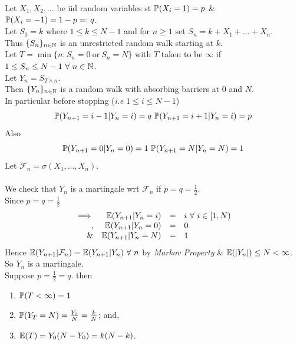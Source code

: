 \documentclass[11pt,a4paper]{article}
\begin{document}
\proposition{}
Let $X_1,X_2,\dots$ be iid random variables st $\mathbb{P}(X_i=1)=p$ \& $\mathbb{P}(X_i=-1)=1-p=:q$.\\
Let $S_0=k$ where $1\leq k\leq N-1$ and for $n\geq 1$ set $S_n=k+X_1+\dots+X_n$.\\
Thus $\{S_n\}_{n\in\mathbb{N}}$ is an unrestricted random walk starting at $k$.\\
Let $T=\min\{n:S_n=0\ \mathrm{or}\ S_n=N\}$ with $T$ taken to be $\infty$ if $1\leq S_n\leq N-1\ \forall\ n\in\nats$.\\
Let $Y_n=S_{T\wedge n}$.\\
Then $\{Y_n\}_{n\in\mathbb{N}}$ is a random walk with absorbing barriers at $0$ and $N$.\\
In particular before stopping (\textit{i.e} $1\leq i\leq N-1$)
$$\prob(Y_{n+1}=i-1|Y_n=i)=q\ \prob(Y_{n+1}=i+1|Y_n=i)=p$$
Also
$$\prob(Y_{n+1}=0|Y_n=0)=1\ \prob(Y_{n+1}=N|Y_n=N)=1$$
Let $\mathcal{F}_n=\sigma(X_1,\dots,X_n)$.\\
\\
We check that $Y_n$ is a martingale wrt $\mathcal{F}_n$ if $p=q=\frac{1}{2}$.\\
Since $p=q=\frac{1}{2}$
\[\begin{array}{rrcl}
\implies&\mathbb{E}(Y_{n+1}|Y_n=i)&=&i\ \forall\ i\in[1,N)\\
,&\mathbb{E}(Y_{n+1}|Y_n=0)&=&0\\
\&&\mathbb{E}(Y_{n+1}|Y_n=N)&=&1
\end{array}\]
Hence $\expect(Y_{n+1}|\mathcal{F}_n)=\expect(Y_{n+1}|Y_n)\ \forall\ n$ by \textit{Markov Property} \& $\mathbb{E}(|Y_n|)\leq N<\infty$.\\
So $Y_n$ is a martingale.\\

Suppose $p=\frac{1}{2}=q$. then
\begin{enumerate}
	\item $\mathbb{P}(T<\infty)=1$
	\item $\mathbb{P}(Y_T=N)=\frac{Y_0}{N}=\frac{k}{N}$; and,
	\item $\mathbb{E}(T)=Y_0(N-Y_0)=k(N-k)$.
\end{enumerate}
\end{document}

